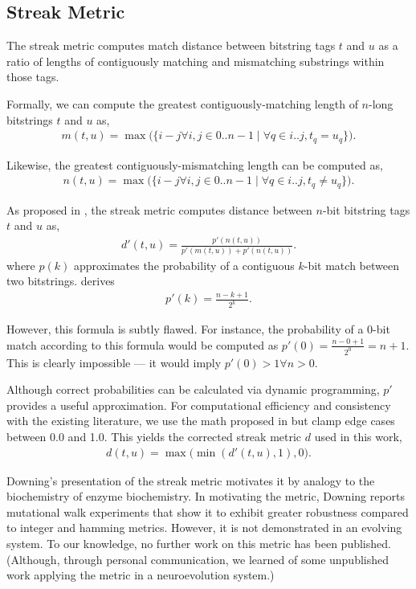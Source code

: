 \subsection{Streak Metric} \label{sec:streak}

The streak metric computes match distance between bitstring tags $t$ and $u$ as a ratio of lengths of contiguously matching and mismatching substrings within those tags.

Formally, we can compute the greatest contiguously-matching length of $n$-long bitstrings $t$ and $u$ as,
\begin{align*}
m(t, u) = \max\Big(\{i - j \forall i, j \in 0..n-1 \mid \forall q \in i..j, t_q = u_q \}\Big).
\end{align*}

Likewise, the greatest contiguously-mismatching length can be computed as,
\begin{align*}
n(t, u) = \max\Big(\{i - j \forall i, j \in 0..n-1 \mid \forall q \in i..j, t_q \neq u_q \}\Big).
\end{align*}

As proposed in \cite{downing2015intelligence}, the streak metric computes distance between $n$-bit bitstring tags $t$ and $u$ as,
\begin{align*}
d'(t, u)
= \frac{p'(n(t,u))}{p'(m(t,u)) + p'(n(t,u))}.
\end{align*}
where $p(k)$ approximates the probability of a contiguous $k$-bit match between two bitstrings.
\cite{downing2015intelligence} derives
\begin{align*}
p'(k)
= \frac{n - k + 1}{2^k}.
\end{align*}

However, this formula is subtly flawed.
For instance, the probability of a $0$-bit match according to this formula would be computed as $p'(0) = \frac{n - 0 + 1}{2^0} = n + 1$.
This is clearly impossible --- it would imply $p'(0) > 1 \forall n > 0$.

Although correct probabilities can be calculated via dynamic programming, $p'$ provides a useful approximation.
For computational efficiency and consistency with the existing literature, we use the math proposed in \citep{downing2015intelligence} but clamp edge cases between 0.0 and 1.0.
This yields the corrected streak metric $d$ used in this work,
\begin{align*}
d(t, u) = \max\Big( \min( d'(t, u), 1), 0 \Big).
\end{align*}

Downing's presentation of the streak metric motivates it by analogy to the biochemistry of enzyme biochemistry. 
In motivating the metric, Downing reports mutational walk experiments that show it to exhibit greater robustness compared to integer and hamming metrics.
However, it is not demonstrated in an evolving system.
To our knowledge, no further work on this metric has been published.
(Although, through personal communication, we learned of some unpublished work applying the metric in a neuroevolution system.)

